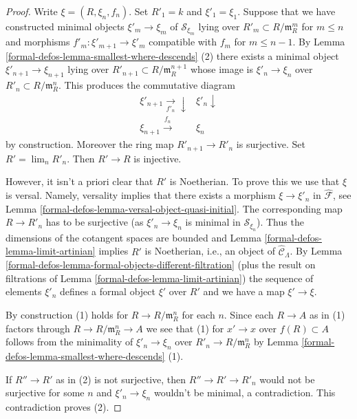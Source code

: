 \begin{proof}
Write $\xi = (R, \xi_n, f_n)$. Set $R'_1 = k$ and
$\xi'_1 = \xi_1$. Suppose that we have constructed
minimal objects $\xi'_m \to \xi_m$ of $\mathcal{S}_{\xi_m}$
lying over $R'_m \subset R/\mathfrak m_R^m$ for $m \leq n$
and morphisms $f'_m : \xi'_{m + 1} \to \xi'_m$ compatible with $f_m$
for $m \leq n - 1$. By
Lemma \ref{formal-defos-lemma-smallest-where-descends} (2)
there exists a minimal object $\xi'_{n + 1} \to \xi_{n + 1}$ lying over
$R'_{n + 1} \subset R/\mathfrak m_R^{n + 1}$ whose image
is $\xi'_n \to \xi_n$ over $R'_n \subset R/\mathfrak m_R^n$.
This produces the commutative diagram
$$
\begin{array}{cc}\xi'_{n + 1} \underset{f'_n}{\longrightarrow}\downarrow & \xi'_n \downarrow \\ \xi_{n + 1} \overset{f_n}{\longrightarrow} & \xi_n\end{array}
$$
by construction. Moreover the ring map $R'_{n + 1} \to R'_n$
is surjective. Set $R' = \lim_n R'_n$. Then $R' \to R$ is injective.

\medskip\noindent
However, it isn't a priori clear that $R'$ is Noetherian. To prove this
we use that $\xi$ is versal. Namely, versality implies that there exists
a morphism $\xi \to \xi'_n$ in $\widehat{\mathcal{F}}$, see
Lemma \ref{formal-defos-lemma-versal-object-quasi-initial}.
The corresponding map $R \to R'_n$ has to be surjective (as
$\xi'_n \to \xi_n$ is minimal in $\mathcal{S}_{\xi_n}$).
Thus the dimensions of the cotangent spaces are bounded and
Lemma \ref{formal-defos-lemma-limit-artinian}
implies $R'$ is Noetherian, i.e., an object of $\widehat{\mathcal{C}}_\Lambda$.
By
Lemma \ref{formal-defos-lemma-formal-objects-different-filtration}
(plus the result on filtrations of
Lemma \ref{formal-defos-lemma-limit-artinian})
the sequence of elements $\xi'_n$ defines a formal object $\xi'$ over $R'$
and we have a map $\xi' \to \xi$.

\medskip\noindent
By construction (1) holds for $R \to R/\mathfrak m_R^n$ for each $n$.
Since each $R \to A$ as in (1) factors through $R \to R/\mathfrak m_R^n \to A$
we see that (1) for $x' \to x$ over $f(R) \subset A$ follows from the
minimality of $\xi'_n \to \xi_n$ over $R'_n \to R/\mathfrak m_R^n$ by
Lemma \ref{formal-defos-lemma-smallest-where-descends} (1).

\medskip\noindent
If $R'' \to R'$ as in (2) is not surjective, then $R'' \to R' \to R'_n$
would not be surjective for some $n$ and $\xi'_n \to \xi_n$ wouldn't
be minimal, a contradiction. This contradiction proves (2).
\end{proof}

